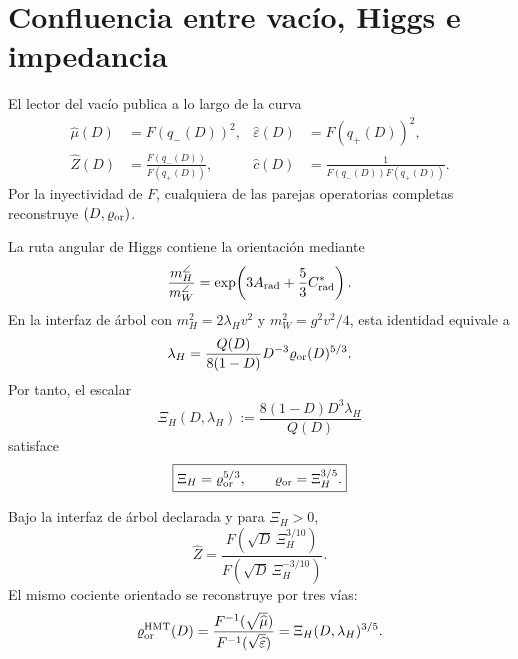 \section{Confluencia entre vac\'io, Higgs e impedancia}

El lector del vac\'io publica a lo largo de la curva
\begin{align}
 \widehat\mu(D)&=F(q_-(D))^2,
 &\widehat\varepsilon(D)&=F(q_+(D))^2,
 \label{rm:eq:curve-vacuum-D}\\
 \widehat Z(D)&=\frac{F(q_-(D))}{F(q_+(D))},
 &\widehat c(D)&=\frac1{F(q_-(D))F(q_+(D))}.
 \label{rm:eq:curve-Z-c-D}
\end{align}
Por la inyectividad de \(F\), cualquiera de las parejas operatorias
completas reconstruye \((D,\varrho_{\rm or})\).

La ruta angular de Higgs contiene la orientaci\'on mediante
\begin{equation}
 \frac{m_H^{\angle}}{m_W^{\angle}}
 =\exp\!\left(3A_{\rm rad}+\frac53C^*_{\rm rad}\right).
 \label{rm:eq:curve-HW-ratio}
\end{equation}
En la interfaz de \'arbol con
\(m_H^2=2\lambda_Hv^2\) y \(m_W^2=g^2v^2/4\), esta identidad equivale a
\begin{equation}
 \lambda_H
 =\frac{Q(D)}{8(1-D)}D^{-3}
  \varrho_{\rm or}(D)^{5/3}.
 \label{rm:eq:curve-lambda-H}
\end{equation}
Por tanto, el escalar
\begin{equation}
 \Xi_H(D,\lambda_H)
 :=\frac{8(1-D)D^3\lambda_H}{Q(D)}
 \label{rm:eq:curve-Xi-H}
\end{equation}
satisface
\begin{equation}
 \boxed{
 \Xi_H=\varrho_{\rm or}^{5/3},
 \qquad
 \varrho_{\rm or}=\Xi_H^{3/5}.}
 \label{rm:eq:curve-Higgs-rho}
\end{equation}

\begin{corollary}
\label{rm:cor:curve-Higgs-impedance}
Bajo la interfaz de \'arbol declarada y para \(\Xi_H>0\),
\begin{equation}
 \boxed{
 \widehat Z
 =\frac{
 F\!\left(\sqrt D\,\Xi_H^{3/10}\right)}
 {F\!\left(\sqrt D\,\Xi_H^{-3/10}\right)}.}
 \label{rm:eq:curve-Higgs-Z}
\end{equation}
El mismo cociente orientado se reconstruye por tres v\'ias:
\begin{equation}
 \varrho_{\rm or}^{\rm HMT}(D)
 =\frac{F^{-1}(\sqrt{\widehat\mu})}
        {F^{-1}(\sqrt{\widehat\varepsilon})}
 =\Xi_H(D,\lambda_H)^{3/5}.
 \label{rm:eq:curve-triple-confluence}
\end{equation}
\end{corollary}

